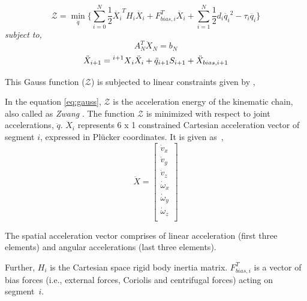  


% 
 \begin{equation} \label{eq:gauss}
	\mathcal{Z} = \min_{\ddot{q}} \Big \{\sum_{i=0}^{N} \frac{1}{2} \ddot{X_i}^T H_i \ddot{X_i} + F_{bias, i}^T\ddot{X_i} + \sum_{i=1}^{N} \frac{1}{2} d_i \ddot{q_i}^2 - \tau_i \ddot{q_i} \Big \}
 \end{equation} 
\hspace{70pt}\textit{subject to,}
\begin{equation} \label{eq:constraint1}
A_N^T \ddot{X}_N = b_N
\end{equation} 
\begin{equation} \label{eq:constraint2}
\ddot{X}_{i+1} = \prescript{i+1}{}{X}_i \ddot{X}_i + \ddot{q}_{i+1} S_{i+1} + \ddot{X}_{bias, i+1}
\end{equation} 

 This Gauss function ($\mathcal{Z}$) is subjected to linear constraints given by \cite{shakhimardanov2015composable},
 
 In the equation \ref{eq:gauss},  $\mathcal{Z}$ is the acceleration energy of the kinematic chain, also called as \textit{Zwang} \cite{shakhimardanov2015composable}.  The function $\mathcal{Z}$ is minimized with respect to joint accelerations, $\ddot{q}$. $\ddot{X}_i$ represents 6 x 1 constrained Cartesian acceleration vector of segment $i$, expressed in Pl{\"u}cker coordinates. It is given as~\cite{featherstone2014rigid},
 \begin{equation}\label{eq:plucker}
	 \ddot{X} = \begin{bmatrix}
		 \dot{v}_x \\
		 \dot{v}_y \\
		 \dot{v}_z \\
		 \dot{\omega}_x \\
		 \dot{\omega}_y \\
		 \dot{\omega}_z \\
	 \end{bmatrix}
 \end{equation}
 
 The spatial acceleration vector comprises of linear acceleration (first three elements) and angular accelerations (last three elements). 
 
 
 Further, $H_i$ is the Cartesian space rigid body inertia matrix. $F_{bias, i}^T$ is a vector of bias forces (i.e., external forces, Coriolis and centrifugal forces) acting on segment~$i$. 
 
